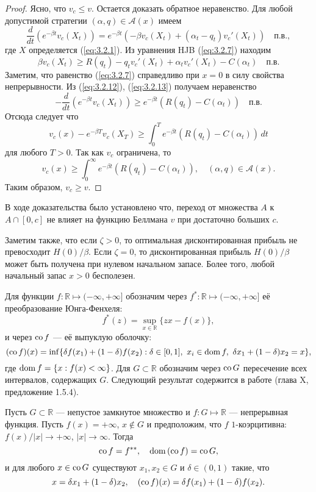 \begin{proof}
Ясно, что $v_c\le v$. Остается доказать обратное неравенство. Для любой допустимой стратегии $(\alpha,q)\in\mathscr A(x)$ имеем
\begin{equation} \label{eq:3.2.12}
\frac{d}{dt}(e^{-\beta t}v_c(X_t))=e^{-\beta t}(-\beta v_c(X_t)+(\alpha_t-q_t)v_c'(X_t))\quad \text{п.в.},
\end{equation}
где $X$ определяется (\ref{eq:3.2.1}). Из уравнения HJB (\ref{eq:3.2.7}) находим
\begin{equation} \label{eq:3.2.13}
 \beta v_c(X_t)\ge R(q_t)-q_t v_c'(X_t)+\alpha_t v_c'(X_t)-C(\alpha_t)\quad \text{п.в.}
\end{equation}
Заметим, что равенство (\ref{eq:3.2.7}) справедливо при $x=0$ в силу свойства непрерывности. Из (\ref{eq:3.2.12}), (\ref{eq:3.2.13}) получаем неравенство
$$ -\frac{d}{dt}(e^{-\beta t}v_c(X_t))\ge e^{-\beta t} (R(q_t)-C(\alpha_t)) \quad \text{п.в.} $$
Отсюда следует что
$$ v_c(x)-e^{-\beta T}v_c(X_T)\ge\int_0^T e^{-\beta t} (R(q_t)-C(\alpha_t))\, dt$$
для любого $T>0$. Так как $v_c$ ограничена, то
$$ v_c(x)\ge \int_0^\infty e^{-\beta t} (R(q_t)-C(\alpha_t)),\quad (\alpha,q)\in\mathscr A(x).$$
Таким образом, $v_c\ge v$.
\end{proof}

В ходе доказательства было установлено что, переход от множества $A$ к $A\cap [0,c]$ не влияет на функцию Беллмана $v$ при достаточно больших $c$.

Заметим также, что если $\zeta>0$, то оптимальная дисконтированная прибыль не превосходит $H(0)/\beta$. Если $\zeta=0$, то дисконтированная прибыль $H(0)/\beta$ может быть получена при нулевом начальном запасе. Более того, любой начальный запас $x>0$ бесполезен.

Для функции $f:\mathbb R\mapsto (-\infty,+\infty]$ обозначим через $f^*:\mathbb R\mapsto (-\infty,+\infty]$ её преобразование Юнга-Фенхеля:
$$ f^*(z)=\sup_{x\in\mathbb R}\{zx-f(x)\},$$
и через ${\rm co\,} f$ --- её выпуклую оболочку:
$$ ({\rm co\,} f)(x)=\inf\{\delta f(x_1)+(1-\delta) f(x_2):\delta\in [0,1],\ x_i\in{\rm dom\,} f,\ \delta x_1+(1-\delta) x_2=x\},$$
где ${\rm dom\,} f=\{x:f(x)<\infty\}$. Для $G\subset\mathbb R$ обозначим через ${\rm co\,} G$ пересечение всех интервалов, содержащих $G$.
Следующий результат содержится в работе \cite{HirUrrLem93} (глава X, предложение 1.5.4).

\begin{lemma} \label{lem:3.4}
Пусть $G\subset\mathbb R$ --- непустое замкнутое множество и $f:G\mapsto\mathbb R$ --- непрерывная функция. Пусть $f(x)=+\infty$, $x\not \in G$ и предположим, что $f$ $1$-коэрцитивна: $f(x)/|x|\to+\infty$, $|x|\to\infty$. Тогда
$${\rm co\,} f=f^{**},\quad {\rm dom\,} ({\rm co\,} f)={\rm co\,} G,$$
и для любого $x\in{\rm co\,} G$ существуют $x_1, x_2\in G$ и $\delta\in (0,1)$ такие, что
\begin{equation} \label{eq:3.2.14}
x=\delta x_1+(1-\delta) x_2,\quad ({\rm co\,} f)(x)=\delta f(x_1)+(1-\delta) f(x_2).
\end{equation}
\end{lemma}

